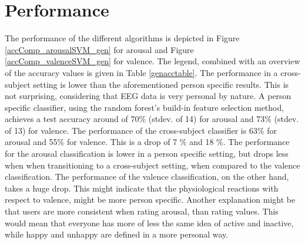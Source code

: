 \section{Performance}
The performance of the different algorithms is depicted in Figure \ref{accComp_arousalSVM_gen} for arousal and Figure \ref{accComp_valenceSVM_gen} for valence. The legend, combined with an overview of the accuracy values is given in Table \ref{genacctable}. The performance in a cross-subject setting is lower than the aforementioned person specific results. This is not surprising, considering that EEG data is very personal by nature. A person specific classifier, using the random forest's build-in feature selection method, achieves a test accuracy around of 70\% (stdev. of 14) for arousal and 73\% (stdev. of 13) for valence. The performance of the cross-subject classifier is 63\% for arousal and 55\% for valence. This is a drop of 7 \% and 18 \%. The performance for the arousal classification is lower in a person specific setting, but drops less when when transitioning to a cross-subject setting, when compared to the valence classification. The performance of the valence classification, on the other hand, takes a huge drop. This might indicate that the physiological reactions with respect to valence, might be more person specific. Another explanation might be that users are more consistent when rating arousal, than rating values. This would mean that everyone has more of less the same idea of active and inactive, while happy and unhappy are defined in a more personal way.

